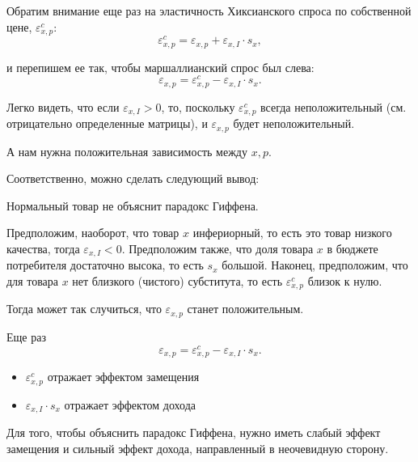 \documentclass{beamer}
\begin{document}
\begin{frame}

Обратим внимание еще раз на эластичность Хиксианского спроса по собственной цене, $\varepsilon^c_{x,p}$:
$$\varepsilon^c_{x,p} = \varepsilon_{x,p} + \varepsilon_{x,I} \cdot s_{x},$$

и перепишем ее так, чтобы маршаллианский спрос был слева:
$$\varepsilon_{x,p} = \varepsilon^c_{x,p} - \varepsilon_{x,I} \cdot s_{x}.$$

Легко видеть, что если $\varepsilon_{x,I} > 0$, то, поскольку $\varepsilon^c_{x,p}$ всегда неположительный (см. отрицательно определенные матрицы), и $\varepsilon_{x,p}$ будет неположительный. 

А нам нужна положительная зависимость между $x,p$. 
\end{frame}

\begin{frame}

Соответственно, можно сделать следующий вывод:

\alert{Нормальный товар не объяснит парадокс Гиффена.}

\end{frame}

\begin{frame}
Предположим, наоборот, что товар $x$ инфериорный, то есть это товар низкого качества, тогда $\varepsilon_{x,I} < 0$. Предположим также, что доля товара $x$ в бюджете потребителя достаточно высока, то есть $s_{x}$ большой. Наконец, предположим, что для товара $x$ нет близкого (чистого) субститута, то есть $\varepsilon^c_{x,p}$ близок к нулю.

Тогда может так случиться, что $\varepsilon_{x,p}$ станет положительным.

\end{frame}

\begin{frame}
Еще раз
$$\varepsilon_{x,p} = \varepsilon^c_{x,p} - \varepsilon_{x,I} \cdot s_{x}.$$
\begin{itemize}
\item $\varepsilon^c_{x,p}$ отражает эффектом замещения
\item $\varepsilon_{x,I} \cdot s_{x}$ отражает эффектом дохода
\end{itemize}

Для того, чтобы объяснить парадокс Гиффена, нужно иметь слабый эффект замещения и сильный эффект дохода, направленный в неочевидную сторону.

\end{frame}
\end{document}
